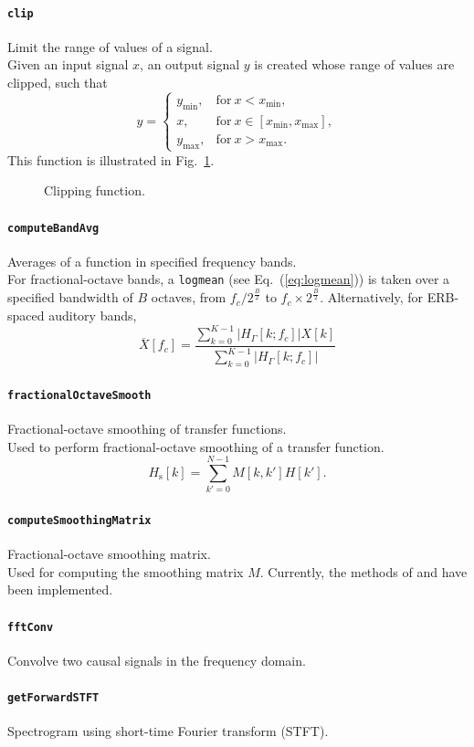 \documentclass[11pt, oneside]{article}
\newcommand{\figref}[1]{Fig.~\ref{#1}}
\newcommand{\eqnref}[1]{Eq.~(\ref{#1})}
\newcommand{\function}[1]{\paragraph*{\texttt{#1}}}
\begin{document}
\function{clip} Limit the range of values of a signal. \\
Given an input signal $x$, an output signal $y$ is created whose range of values are clipped, such that
\begin{equation}
y =
\begin{cases}
y_\text{min}, & \text{for}~x < x_\text{min}, \\
x, & \text{for}~x \in [x_\text{min}, x_\text{max}], \\
y_\text{max}, & \text{for}~x > x_\text{max}.
\end{cases}
\end{equation}
This function is illustrated in \figref{fig:clip}.

\begin{figure}
\centering

\caption{Clipping function.}\label{fig:clip}
\end{figure}

\function{computeBandAvg} Averages of a function in specified frequency bands. \\
For fractional-octave bands, a \texttt{logmean} (see \eqnref{eq:logmean}) is taken over a specified bandwidth of $B$ octaves, from $f_c / 2^{\frac{B}{2}}$ to $f_c \times 2^{\frac{B}{2}}$.
Alternatively, for ERB-spaced auditory bands,
\begin{equation}
\overline{X}[f_c] = \frac{\displaystyle \sum_{k=0}^{K-1} \left| H_\Gamma[k;f_c] \right| X[k]}{\displaystyle \sum_{k=0}^{K-1} \left| H_\Gamma[k;f_c] \right|}
\end{equation}

\function{fractionalOctaveSmooth} Fractional-octave smoothing of transfer functions. \\
Used to perform fractional-octave smoothing of a transfer function.
\begin{equation}\label{eq:fractionalOctaveSmooth}
H_\text{s}[k] = \sum_{k' = 0}^{N - 1} M[k, k'] H[k'].
\end{equation}

\function{computeSmoothingMatrix} Fractional-octave smoothing matrix. \\
Used for computing the smoothing matrix $M$.
Currently, the methods of \citet{HatziantoniouMourjopoulos2000} and \citet{Tylka2017} have been implemented.

\function{fftConv} Convolve two causal signals in the frequency domain. \\

\function{getForwardSTFT} Spectrogram using short-time Fourier transform (STFT). \\
\end{document}
